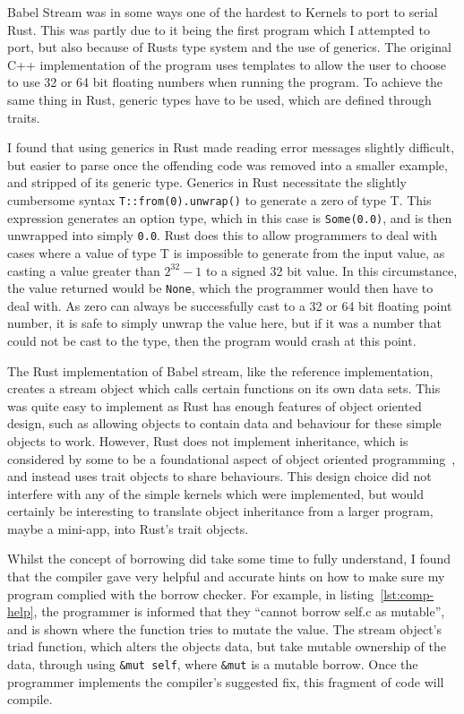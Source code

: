Babel Stream was in some ways one of the hardest to Kernels to port to serial Rust. This was partly due to it being the first program which I attempted to port, but also because of Rusts type system and the use of generics. The original C++ implementation of the program uses templates to allow the user to choose to use 32 or 64 bit floating numbers when running the program. To achieve the same thing in Rust, generic types have to be used, which are defined through traits.

I found that using generics in Rust made reading error messages slightly difficult, but easier to parse once the offending code was removed into a smaller example, and stripped of its generic type. Generics in Rust necessitate the slightly cumbersome syntax \texttt{T::from(0).unwrap()} to generate a zero of type T. This expression generates an option type, which in this case is \texttt{Some(0.0)}, and is then unwrapped into simply \texttt{0.0}. Rust does this to allow programmers to deal with cases where a value of type T is impossible to generate from the input value, as casting a value greater than $2^{32} - 1$ to a signed 32 bit value. In this circumstance, the value returned would be \texttt{None}, which the programmer would then have to deal with. As zero can always be successfully cast to a 32 or 64 bit floating point number, it is safe to simply unwrap the value here, but if it was a number that could not be cast to the type, then the program would crash at this point.

The Rust implementation of Babel stream, like the reference implementation, creates a stream object which calls certain functions on its own data sets. This was quite easy to implement as Rust has enough features of object oriented design, such as allowing objects to contain data and behaviour for these simple objects to work. However, Rust does not implement inheritance, which is considered by some to be a foundational aspect of object oriented programming~\cite{Liskov:1987}, and instead uses trait objects to share behaviours. This design choice did not interfere with any of the simple kernels which were implemented, but would certainly be interesting to translate object inheritance from a larger program, maybe a mini-app, into Rust's trait objects.

Whilst the concept of borrowing did take some time to fully understand, I found that the compiler gave very helpful and accurate hints on how to make sure my program complied with the borrow checker. For example, in listing~\ref{lst:comp-help}, the programmer is informed that they ``cannot borrow self.c as mutable'', and is shown where the function tries to mutate the value. The stream object's triad function, which alters the objects data, but take mutable ownership of the data, through using \texttt{\&mut self}, where \texttt{\&mut} is a mutable borrow. Once the programmer implements the compiler's suggested fix, this fragment of code will compile.


